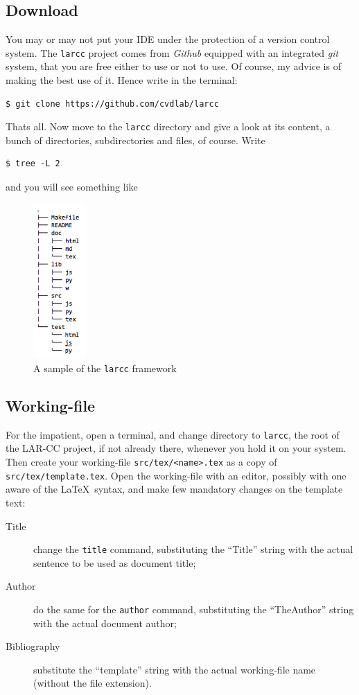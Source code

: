 \documentclass[11pt,oneside]{article}	%
\begin{document}
\subsection{Download}

You may or may not put your IDE under the protection of a version control system. The \texttt{larcc} project comes from \emph{Github} equipped with an integrated \emph{git} system, that you are free either to use or not to use. Of course, my advice  is of making the best use of it. Hence write in the terminal:
\begin{verbatim}
$ git clone https://github.com/cvdlab/larcc
\end{verbatim}

Thats all. Now move to the \texttt{larcc} directory and give a look at its content, a bunch of directories, subdirectories and files, of course. Write
\begin{verbatim}
$ tree -L 2
\end{verbatim}
and you will see something like
\begin{figure}[htbp] %
   \centering
   \includegraphics[width=2cm]{images/tree.png} 
   \caption{A sample of the \texttt{larcc} framework}
   \label{fig:tree}
\end{figure}

\subsection{Working-file}
For the impatient, open a terminal, and change directory to \texttt{larcc}, the root of the LAR-CC project, if not already there, whenever you hold it on your system. Then create your working-file \texttt{src/tex/<name>.tex} as a copy of \texttt{src/tex/template.tex}. Open the working-file with an editor, possibly with one aware of the \LaTeX\ syntax, and make few mandatory changes on the template text: 

\begin{description}
\item[Title] change the \texttt{title} command, substituting the ``Title'' string with the actual sentence to be used as document title;
\item[Author]  do the same for the \texttt{author} command, substituting the ``TheAuthor'' string with the actual document author;

\item[Bibliography] substitute the ``template'' string with the actual working-file name (without the file extension).
\end{description}
\end{document}

